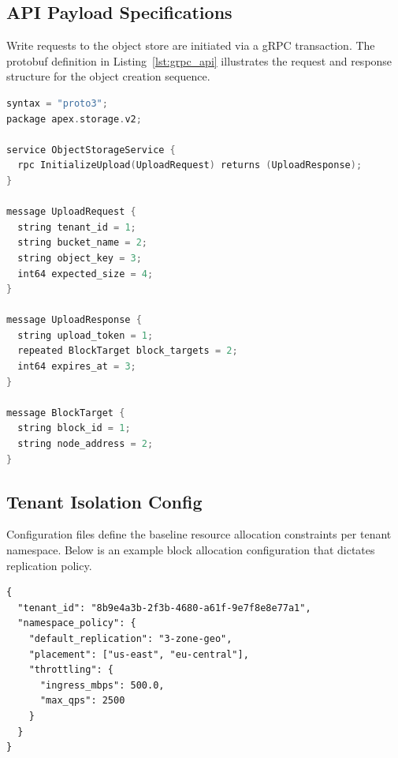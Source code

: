 \subsection{API Payload Specifications}
Write requests to the object store are initiated via a gRPC transaction. The protobuf definition in Listing~\ref{lst:grpc_api} illustrates the request and response structure for the object creation sequence.

\begin{lstlisting}[language=c, caption={Protobuf definition for the write path API.}, label={lst:grpc_api}]
syntax = "proto3";
package apex.storage.v2;

service ObjectStorageService {
  rpc InitializeUpload(UploadRequest) returns (UploadResponse);
}

message UploadRequest {
  string tenant_id = 1;
  string bucket_name = 2;
  string object_key = 3;
  int64 expected_size = 4;
}

message UploadResponse {
  string upload_token = 1;
  repeated BlockTarget block_targets = 2;
  int64 expires_at = 3;
}

message BlockTarget {
  string block_id = 1;
  string node_address = 2;
}
\end{lstlisting}

\subsection{Tenant Isolation Config}
Configuration files define the baseline resource allocation constraints per tenant namespace. Below is an example block allocation configuration that dictates replication policy.

\begin{lstlisting}[caption={Sample JSON configuration for tenancy isolation settings.}]
{
  "tenant_id": "8b9e4a3b-2f3b-4680-a61f-9e7f8e8e77a1",
  "namespace_policy": {
    "default_replication": "3-zone-geo",
    "placement": ["us-east", "eu-central"],
    "throttling": {
      "ingress_mbps": 500.0,
      "max_qps": 2500
    }
  }
}
\end{lstlisting}
